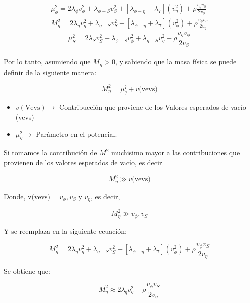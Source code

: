 \documentclass[12pt]{article}
\begin{document}
\begin{equation}
\label{eq:eqeta}
\begin{aligned}
\mu^{2}_\phi = 2\lambda_\phi v_\phi^{2} + \lambda_{\phi-S}v_S ^{2} + [\lambda_{\phi-\eta}+\lambda_7](v_\eta^2) +  \rho \frac{v_\eta v_S }{2v_\phi} \\
M^{2}_\eta = 2\lambda_\eta v_\eta^{2} + \lambda_{\eta-S}v_S ^{2} + [\lambda_{\phi-\eta}+\lambda_7](v_\phi^2) + \rho \frac{v_\phi v_S }{2v_\eta}
\end{aligned}
\end{equation}
 \begin{equation}
  \label{eq:Mu}
      \mu^{2}_S = 2\lambda_S v_S^{2} + \lambda_{\phi-S}v_\phi ^{2} +\lambda_{\eta-S}v_\eta ^{2} + \rho \frac{v_\eta v_\phi }{2v_S}
 \end{equation} \\



Por lo tanto, asumiendo que $ M_\eta >0 $, y sabiendo que la masa física se puede definir de la siguiente manera:

 \[  M^{2}_\eta = \mu^{2}_\eta + v\text{(vevs)}\]
 
\begin{itemize}
\item $v(\text{Vevs}) \rightarrow $ Contribucción que proviene de los Valores esperados de vacío (vevs)
\item $\mu^{2}_\eta \rightarrow $ Parámetro en el potencial. 
\end{itemize}

Si tomamos la contribución de $M^{2}$ muchisimo mayor a las contribuciones que provienen de los valores esperados de vacío, es decir 

 \[  M^{2}_\eta  \gg v\text{(vevs)}  \]

Donde, $\text{v(vevs)} = v_\phi, v_S $ y $v_\eta$, es decir,


 \[  M^{2}_\eta  \gg v_\phi, v_S  \]

Y se reemplaza en la siguiente ecuación: 

 \begin{equation}
   M^{2}_\eta = 2\lambda_\eta v_\eta^{2} + \lambda_{\eta-S}v_S ^{2} + [\lambda_{\phi-\eta}+\lambda_7](v_\phi^2) + \rho \frac{v_\phi v_S }{2v_\eta}
 \end{equation}

Se obtiene que: 


 \begin{equation}
      \label{eq:mass22}
      M^{2}_\eta  \approx 2\lambda_\eta v^{2}_\eta + \rho \frac{v_\phi v_S }{2v_\eta}
 \end{equation}
\end{document}
